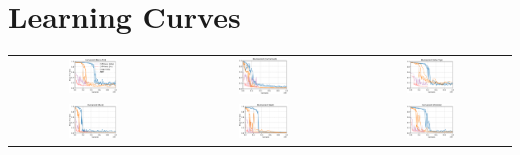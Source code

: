 \section{Learning Curves}
\begin{table}[h!]
    \centering
    \begin{tabular}{ccc}
         \hspace{-10pt}\includegraphics[width=0.31\textwidth]{figures/mixed_backflip_legend.png}
         &
         \includegraphics[width=0.31\textwidth]{figures/mixed_cartwheel.png}
         &
         \includegraphics[width=0.31\textwidth]{figures/mixed_sideflip.png}
         \\
        \hspace{-10pt} \includegraphics[width=0.31\textwidth]{figures/mixed_run.png}
         &
         \includegraphics[width=0.31\textwidth]{figures/mixed_walk.png}
         &
         \includegraphics[width=0.31\textwidth]{figures/mixed_zombie.png}

\end{tabular}
\end{table}
